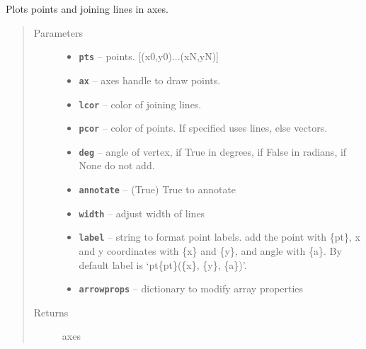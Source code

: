 \documentclass[letterpaper,10pt,english]{sphinxmanual}
\begin{document}
\begin{fulllineitems}
\label{RRtoolbox.lib:RRtoolbox.lib.plotter.plotPointsContour}
Plots points and joining lines in axes.
\begin{quote}\begin{description}
\item[{Parameters}] \leavevmode\begin{itemize}
\item {} 
\textbf{\texttt{pts}} -- points. {[}(x0,y0)...(xN,yN){]}

\item {} 
\textbf{\texttt{ax}} -- axes handle to draw points.

\item {} 
\textbf{\texttt{lcor}} -- color of joining lines.

\item {} 
\textbf{\texttt{pcor}} -- color of points. If specified uses lines, else vectors.

\item {} 
\textbf{\texttt{deg}} -- angle of vertex, if True in degrees, if False in radians, if None do not add.

\item {} 
\textbf{\texttt{annotate}} -- (True) True to annotate

\item {} 
\textbf{\texttt{width}} -- adjust width of lines

\item {} 
\textbf{\texttt{label}} -- string to format point labels. add the point with \{pt\},
x and y coordinates with \{x\} and \{y\}, and angle with \{a\}. By default
label is `pt\{pt\}(\{x\}, \{y\}, \{a\})'.

\item {} 
\textbf{\texttt{arrowprops}} -- dictionary to modify array properties

\end{itemize}

\item[{Returns}] \leavevmode
axes

\end{description}\end{quote}

\end{fulllineitems}
\end{document}
